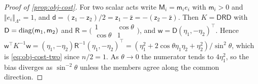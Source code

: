 \begin{proof}[Proof of \cref{prop:obj-cost}]
For two scalar acts write $\mathsf M_i=\mathsf m_ie_i$ with $\mathsf m_i>0$ and $\Vert e_i\Vert_{\Lambda^\star}=1$, and $\mathsf d=(\mathsf z_1-\mathsf z_2)/2=\mathsf z_1-\bar{\mathsf z}=-(\mathsf z_2-\bar{\mathsf z})$. Then $K=\mathsf D\mathsf R\mathsf D$ with $\mathsf D=\operatorname{diag}(\mathsf m_1,\mathsf m_2)$ and $\mathsf R=\bigl(\begin{smallmatrix}1&\cos\theta\\\cos\theta&1\end{smallmatrix}\bigr)$, and $\mathsf w=\mathsf D(\eta_1,-\eta_2)^\top$. Hence $\mathsf w^\top K^{-1}\mathsf w=(\eta_1,-\eta_2)\mathsf R^{-1}(\eta_1,-\eta_2)^\top=(\eta_1^2+2\cos\theta\eta_1\eta_2+\eta_2^2)/\sin^2\theta$, which is \eqref{eq:obj-cost-two} since $n/2=1$. As $\theta\to0$ the numerator tends to $4\eta_1^2$, so the bias diverges as $\sin^{-2}\theta$ unless the members agree along the common direction.
\end{proof}

